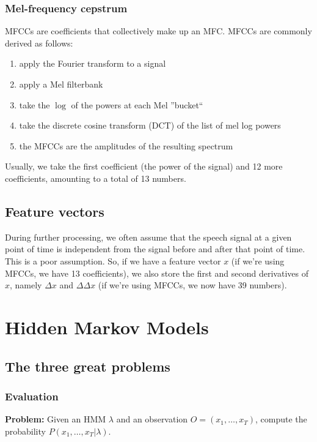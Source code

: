 \documentclass[11pt]{article}
\begin{document}
\subsubsection{Mel-frequency cepstrum}

MFCCs are coefficients that collectively make up an MFC. MFCCs are commonly derived as follows:

\begin{enumerate}
    \item apply the Fourier transform to a signal
    \item apply a Mel filterbank
    \item take the $\log$ of the powers at each Mel ''bucket``
    \item take the discrete cosine transform (DCT) of the list of mel log powers
    \item the MFCCs are the amplitudes of the resulting spectrum
\end{enumerate}

Usually, we take the first coefficient (the power of the signal) and 12 more coefficients, amounting to a total of 13 numbers.

\subsection{Feature vectors}

During further processing, we often assume that the speech signal at a given point of time is independent from the signal before and after that point of time. This is a poor assumption. So, if we have a feature vector $x$ (if we're using MFCCs, we have 13 coefficients), we also store the first and second derivatives of $x$, namely $\Delta x$ and $\Delta \Delta x$ (if we're using MFCCs, we now have 39 numbers).

\section{Hidden Markov Models}

\subsection{The three great problems}

\subsubsection{Evaluation}

\textbf{Problem:} Given an HMM $\lambda$ and an observation $O = (x_1, \ldots, x_T)$, compute the probability $P(x_1, \ldots, x_T | \lambda)$.
\end{document}
